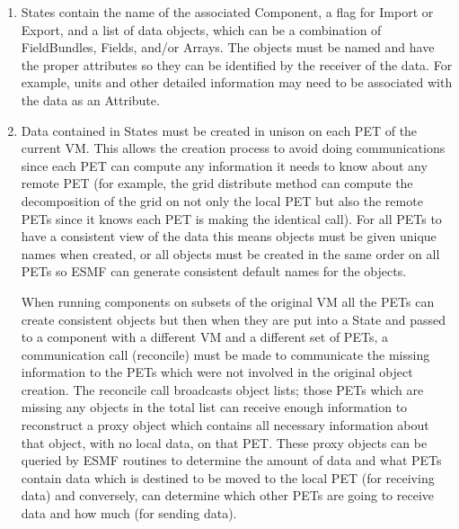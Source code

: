 %


\begin{enumerate}

\item
States contain the name of the associated Component, a flag for Import
or Export, and a list of data objects, which can be a combination of
FieldBundles, Fields, and/or Arrays.  The objects must be named and have
the proper attributes so they can be identified by the receiver of
the data.  For example, units and other detailed information
may need to be associated with the data as an Attribute.  

\item
Data contained in States must be created in unison on each
PET of the current VM.  This allows the creation process to avoid
doing communications since each PET can compute any information
it needs to know about any remote PET (for example, the grid
distribute method can compute the decomposition of the grid on
not only the local PET but also the remote PETs since it knows
each PET is making the identical call).  For all PETs to have a
consistent view of the data this means objects must be given
unique names when created, or all objects must be created in
the same order on all PETs so ESMF can generate consistent
default names for the objects.

When running components on subsets of the original VM all the
PETs can create consistent objects but then when they are put
into a State and passed to a component with a different VM and
a different set of PETs, a communication call (reconcile) must be 
made to communicate the missing information to the PETs which were 
not involved in the original object creation.  The reconcile call
broadcasts object lists; those PETs which are missing any objects
in the total list can receive enough information to
reconstruct a proxy object which contains all necessary information
about that object, with no local data, on that PET.  These proxy
objects can be queried by ESMF routines to determine the amount
of data and what PETs contain data which is destined to be moved
to the local PET (for receiving data) and conversely, can determine
which other PETs are going to receive data and how much (for
sending data).


\end{enumerate}
